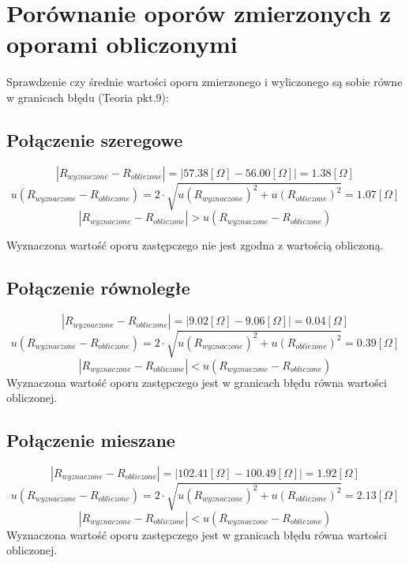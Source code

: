 \documentclass{article}
\begin{document}
    \section{Porównanie oporów zmierzonych z oporami obliczonymi}
        Sprawdzenie czy średnie wartości oporu zmierzonego i wyliczonego są sobie równe w granicach błędu (Teoria pkt.9):
        
        \subsection{Połączenie szeregowe}
        
        \[
            \left|R_{wyznaczone}-R_{obliczone}\right| =\left| 57.38 \left[\Omega\right] - 56.00 \left[\Omega\right]\right| = 1.38 \left[\Omega\right]
        \]
        \[
            u(R_{wyznaczone}-R_{obliczone})= 2\cdot\sqrt{u(R_{wyznaczone})^2+u(R_{obliczone})^2} = 1.07 \left[\Omega\right]
        \]
        \[
            \left|R_{wyznaczone}-R_{obliczone}\right| > u(R_{wyznaczone}-R_{obliczone})
        \]
        
        Wyznaczona wartość oporu zastępczego nie jest zgodna z wartością obliczoną.
        
        \subsection{Połączenie równoległe}
        
        \[
            \left|R_{wyznaczone}-R_{obliczone}\right| = \left|9.02 \left[\Omega\right] - 9.06 \left[\Omega\right]\right| = 0.04 \left[\Omega\right]
        \]
        \[
            u(R_{wyznaczone}-R_{obliczone})= 2\cdot\sqrt{u(R_{wyznaczone})^2+u(R_{obliczone})^2} = 0.39 \left[\Omega\right]
        \]
        \[
            \left|R_{wyznaczone}-R_{obliczone}\right| < u(R_{wyznaczone}-R_{obliczone})
        \]
        Wyznaczona wartość oporu zastępczego jest w granicach błędu równa wartości obliczonej.

        \subsection{Połączenie mieszane}
        
        \[
            \left|R_{wyznaczone}-R_{obliczone}\right| = \left|102.41 \left[\Omega\right] - 100.49 \left[\Omega\right]\right| = 1.92 \left[\Omega\right]
        \]
        \[
            u(R_{wyznaczone}-R_{obliczone})= 2\cdot\sqrt{u(R_{wyznaczone})^2+u(R_{obliczone})^2} = 2.13 \left[\Omega\right]
        \]
        \[
            \left|R_{wyznaczone}-R_{obliczone}\right| < u(R_{wyznaczone}-R_{obliczone})
        \]
                Wyznaczona wartość oporu zastępczego jest w granicach błędu równa wartości obliczonej.
    
\end{document}
